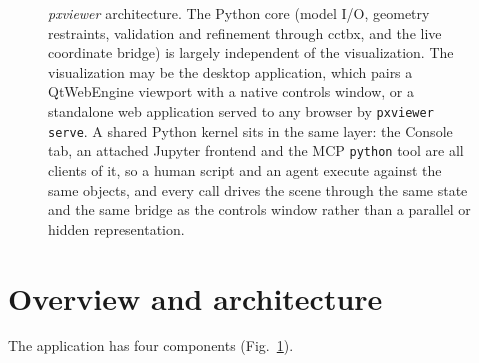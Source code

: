 \documentclass[11pt]{article}
\newcommand{\pxviewer}{\emph{pxviewer}}
\begin{document}
\begin{figure}[H]
{}
\caption{\pxviewer{} architecture. The Python core (model I/O, geometry
restraints, validation and refinement through cctbx, and the live coordinate
bridge) is largely independent of the visualization. The visualization may
be the desktop application, which pairs a QtWebEngine viewport with a native
controls window, or a standalone web application served to any browser by
\texttt{pxviewer serve}. A shared Python kernel sits in the same layer: the
Console tab, an attached Jupyter frontend and the MCP \texttt{python} tool
are all clients of it, so a human script and an agent execute against the
same objects, and every call drives the scene through the same state and
the same bridge as the controls window rather than a parallel or hidden
representation. }
\label{fig:arch}
\end{figure}

\section{Overview and architecture}

The application has four components (Fig.~\ref{fig:arch}).
\end{document}
